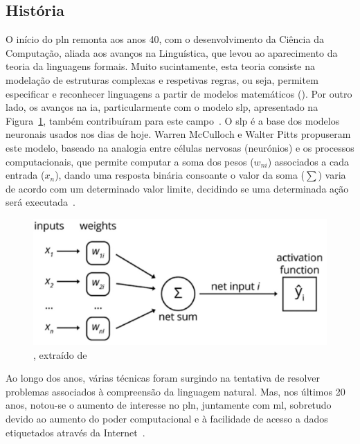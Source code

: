 \subsection{História}
O início do \gls{pln} remonta aos anos 40, com o desenvolvimento da Ciência da Computação, aliada aos avanços na Linguística, que levou ao aparecimento da teoria da linguagens formais. Muito sucintamente, esta teoria consiste na modelação de estruturas complexas e respetivas regras, ou seja, permitem especificar e reconhecer linguagens a partir de modelos matemáticos (). Por outro lado, os avanços na \gls{ia}, particularmente com o modelo \gls{slp}, apresentado na Figura~\ref{fig:slp}, também contribuíram para este campo~\parencite{applied_natural_language_processing_with_python}. O \gls{slp} é a base dos modelos neuronais usados nos dias de hoje. Warren McCulloch e Walter Pitts propuseram este modelo, baseado na analogia entre células nervosas (neurónios) e os processos computacionais, que permite computar a soma dos pesos ($w_{ni}$) associados a cada entrada ($x_{n}$), dando uma resposta binária consoante o valor da soma ($\sum$) varia de acordo com um determinado valor limite, decidindo se uma determinada ação será executada~\parencite{introduction_theory_neural_computation}.
%
\begin{figure}
    \centering
    \includegraphics[width=.8\textwidth]{ch03/assets/slp_model.jpg}
    \caption{, extraído de~\textcite{applied_natural_language_processing_with_python}}
    \label{fig:slp}
\end{figure}

Ao longo dos anos, várias técnicas foram surgindo na tentativa de resolver problemas associados à compreensão da linguagem natural. Mas, nos últimos 20 anos, notou-se o aumento de interesse no \gls{pln}, juntamente com \gls{ml}, sobretudo devido ao aumento do poder computacional e à facilidade de acesso a dados etiquetados através da Internet~\parencite{applied_natural_language_processing_with_python}.

